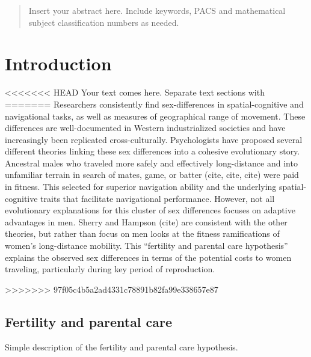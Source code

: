 \date{Received: date / Accepted: date}


\maketitle

\begin{abstract}
Insert your abstract here. Include keywords, PACS and mathematical
subject classification numbers as needed.
\end{abstract}

\section{Introduction}
\label{sec:1}
<<<<<<< HEAD
Your text comes here. Separate text sections with
=======
Researchers consistently find sex-differences in spatial-cognitive and navigational tasks, as well as measures of geographical range of movement.  These differences are well-documented in Western industrialized societies and have increasingly been replicated cross-culturally.  Psychologists have proposed several different theories linking these sex differences into a cohesive evolutionary story.  Ancestral males who traveled more safely and effectively long-distance and into unfamiliar terrain in search of mates, game, or batter (cite, cite, cite) were paid in fitness.  This selected for superior navigation ability and the underlying spatial-cognitive traits that facilitate navigational performance.  However, not all evolutionary explanations for this cluster of sex differences focuses on adaptive advantages in men.  Sherry and Hampson (cite) are consistent with the other theories, but rather than focus on men looks at the fitness ramifications of women's long-distance mobility.  This ``fertility and parental care hypothesis'' explains the observed sex differences in terms of the potential costs to women traveling, particularly during key period of reproduction.

>>>>>>> 97f05c4b5a2ad4331c78891b82fa99e338657e87
	\subsection{Fertility and parental care}
	\label{sec:1.1}
Simple description of the fertility and parental care hypothesis.

